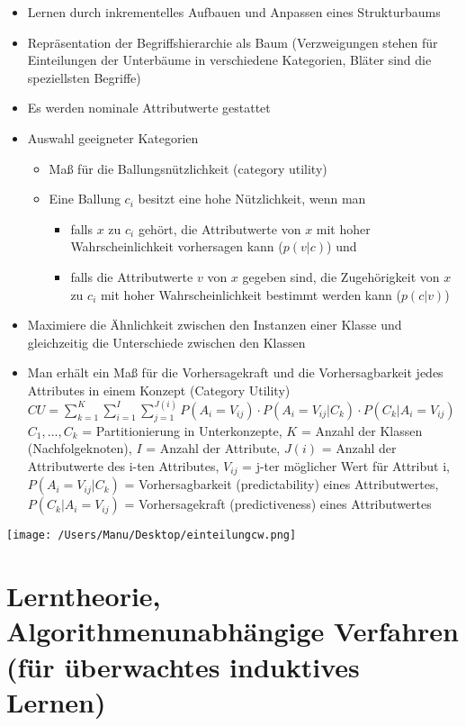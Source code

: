 \documentclass[paper=a4, fontsize=11pt]{scrartcl} %
\numberwithin{equation}{section} %
\numberwithin{figure}{section} %
\numberwithin{table}{section} %
\begin{document}
\begin{itemize}
\item Lernen durch inkrementelles Aufbauen und Anpassen eines Strukturbaums
\item Repräsentation der Begriffshierarchie als Baum (Verzweigungen stehen für Einteilungen der Unterbäume in verschiedene Kategorien, Bläter sind die speziellsten Begriffe)
\item Es werden nominale Attributwerte gestattet
\item Auswahl geeigneter Kategorien
\begin{itemize}
\item Maß für die Ballungsnützlichkeit (category utility)
\item Eine Ballung $c_i$ besitzt eine hohe Nützlichkeit, wenn man 
\begin{itemize}
\item falls $x$ zu $c_i$ gehört, die Attributwerte von $x$ mit hoher Wahrscheinlichkeit vorhersagen kann ($p(v|c)$) und
\item falls die Attributwerte $v$ von $x$ gegeben sind, die Zugehörigkeit von $x$ zu $c_i$ mit hoher Wahrscheinlichkeit bestimmt werden kann ($p(c|v)$)
\end{itemize}
\end{itemize}
\item Maximiere die Ähnlichkeit zwischen den Instanzen einer Klasse und gleichzeitig die Unterschiede zwischen den Klassen
\item Man erhält ein Maß für die Vorhersagekraft und die Vorhersagbarkeit jedes Attributes in einem Konzept (Category Utility)\\ 
$CU = \sum\limits_{k=1}^{K} \sum\limits_{i=1}^I \sum\limits_{j=1}^{J(i)} P(A_i = V_{ij}) \cdot P(A_i = V_{ij} | C_k) \cdot P(C_k|A_i = V_{ij})$\\ 
$C_1,...,C_k$ = Partitionierung in Unterkonzepte, $K$ = Anzahl der Klassen (Nachfolgeknoten), $I$ = Anzahl der Attribute, $J(i)$ = Anzahl der Attributwerte des i-ten Attributes, $V_{ij}$ = j-ter möglicher Wert für Attribut i, $P(A_i=V_{ij} | C_k)$ = Vorhersagbarkeit (predictability) eines Attributwertes, $P(C_k|A_i = V_{ij})$ = Vorhersagekraft (predictiveness) eines Attributwertes
\end{itemize}

\texttt{[image: /Users/Manu/Desktop/einteilungcw.png]}

\section{Lerntheorie, Algorithmenunabhängige Verfahren (für überwachtes induktives Lernen)}
\end{document}
